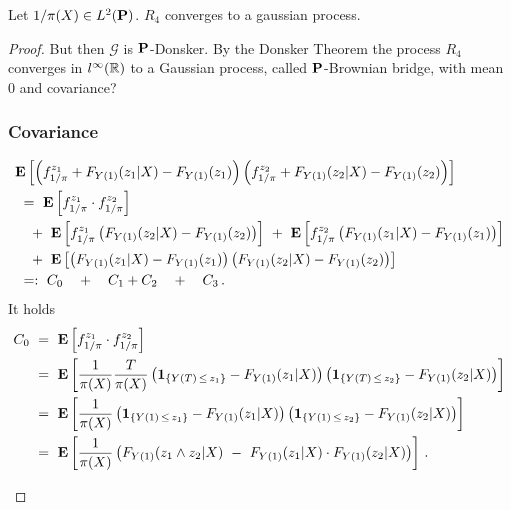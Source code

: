 \begin{lemma}
  \label{aa:mean:l:r4}
  Let
  $1/\pi(X)\in L^2(\P)$.
  $R_4$ converges to a gaussian process.
\end{lemma}
\begin{proof}
But then $\mathcal{G}$ is $\P$-Donsker.
By the Donsker Theorem \cite[Theorem~19.5]{Vaart2000}
the process $R_4$ converges in $l^\infty(\R)$ to a Gaussian process, called $\P$-Brownian bridge, with mean 0 and covariance?
\subsubsection*{Covariance}
\begin{align*}
  &
  \E
  \left[
  \left( 
  f^{z_1}_{1/\pi}
  +
  F_{Y(1)}(z_1|X)
  -
F_{Y(1)}(z_1)
  \right)
  \left( 
  f^{z_2}_{1/\pi}
  +
  F_{Y(1)}(z_2|X)
  -
F_{Y(1)}(z_2)
  \right)
  \right]
  \\
  &
  \ 
  =
  \ 
\E
\left[
  f^{z_1}_{1/\pi}
  \cdot
  f^{z_2}_{1/\pi}
\right]
\\
  &
  \quad
  +
  \ 
  \E
  \left[
  f^{z_1}_{1/\pi}
  \left( 
  F_{Y(1)}(z_2|X)
  -
F_{Y(1)}(z_2)
  \right)
  \right]
  \ 
  +
  \ 
  \E
  \left[
  f^{z_2}_{1/\pi}
  \left( 
  F_{Y(1)}(z_1|X)
  -
F_{Y(1)}(z_1)
  \right)
  \right]
  \\
  &
  \quad
  +
  \ 
  \E
  \left[
  \left( 
  F_{Y(1)}(z_1|X)
  -
F_{Y(1)}(z_1)
  \right)
  \left( 
  F_{Y(1)}(z_2|X)
  -
F_{Y(1)}(z_2)
  \right)
  \right]
  \\
  &
  \ 
  =:
  \ 
  C_0
  \quad 
  +
  \quad 
  C_1
  +
  C_2
  \quad 
  +
  \quad 
  C_3
  \,.
\end{align*}
It holds
\begin{align*}
  C_0 
  &
  \ 
  =
  \ 
\E
\left[
  f^{z_1}_{1/\pi}
  \cdot
  f^{z_2}_{1/\pi}
\right]
\\
&
\ 
=
\ 
\E
\left[
\frac{1}{\pi(X)}
\frac{T}{\pi(X)}
\left( 
\mathbf{1}_{\left\{ Y(T)\,\le\, z_1 \right\}}
-
F_{Y(1)}(z_1|X)
\right)
\left( 
\mathbf{1}_{\left\{ Y(T)\,\le\, z_2 \right\}}
-
F_{Y(1)}(z_2|X)
\right)
\right]
\\
&
\ 
=
\ 
\E
\left[
\frac{1}{\pi(X)}
\left( 
\mathbf{1}_{\left\{ Y(1)\,\le\, z_1 \right\}}
-
F_{Y(1)}(z_1|X)
\right)
\left( 
\mathbf{1}_{\left\{ Y(1)\,\le\, z_2 \right\}}
-
F_{Y(1)}(z_2|X)
\right)
\right]
\\
&
\ 
=
\ 
\E
\left[
\frac{1}{\pi(X)}
\left( 
F_{Y(1)}(z_1\land z_2|X)
\ 
-
\ 
F_{Y(1)}(z_1|X)
\cdot
F_{Y(1)}(z_2|X)
\right)
\right]
\,.
\end{align*}
\begin{align*}

\end{align*}
\end{proof}
